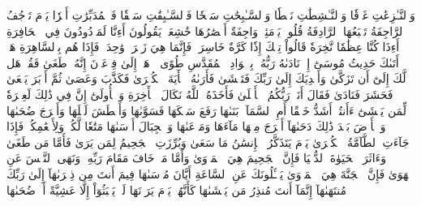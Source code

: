 وَٱلنَّـٰزِعَٰتِ غَرۡقٗا
وَٱلنَّـٰشِطَٰتِ نَشۡطٗا
وَٱلسَّـٰبِحَٰتِ سَبۡحٗا
فَٱلسَّـٰبِقَٰتِ سَبۡقٗا
فَٱلۡمُدَبِّرَٰتِ أَمۡرٗا
يَوۡمَ تَرۡجُفُ ٱلرَّاجِفَةُ
تَتۡبَعُهَا ٱلرَّادِفَةُ
قُلُوبٞ يَوۡمَئِذٖ وَاجِفَةٌ
أَبۡصَٰرُهَا خَٰشِعَةٞ
يَقُولُونَ أَءِنَّا لَمَرۡدُودُونَ فِي ٱلۡحَافِرَةِ
أَءِذَا كُنَّا عِظَٰمٗا نَّخِرَةٗ
قَالُواْ تِلۡكَ إِذٗا كَرَّةٌ خَاسِرَةٞ
فَإِنَّمَا هِيَ زَجۡرَةٞ وَٰحِدَةٞ
فَإِذَا هُم بِٱلسَّاهِرَةِ
هَلۡ أَتَىٰكَ حَدِيثُ مُوسَىٰٓ
إِذۡ نَادَىٰهُ رَبُّهُۥ بِٱلۡوَادِ ٱلۡمُقَدَّسِ طُوًى
ٱذۡهَبۡ إِلَىٰ فِرۡعَوۡنَ إِنَّهُۥ طَغَىٰ
فَقُلۡ هَل لَّكَ إِلَىٰٓ أَن تَزَكَّىٰ
وَأَهۡدِيَكَ إِلَىٰ رَبِّكَ فَتَخۡشَىٰ
فَأَرَىٰهُ ٱلۡأٓيَةَ ٱلۡكُبۡرَىٰ
فَكَذَّبَ وَعَصَىٰ
ثُمَّ أَدۡبَرَ يَسۡعَىٰ
فَحَشَرَ فَنَادَىٰ
فَقَالَ أَنَا۠ رَبُّكُمُ ٱلۡأَعۡلَىٰ
فَأَخَذَهُ ٱللَّهُ نَكَالَ ٱلۡأٓخِرَةِ وَٱلۡأُولَىٰٓ
إِنَّ فِي ذَٰلِكَ لَعِبۡرَةٗ لِّمَن يَخۡشَىٰٓ
ءَأَنتُمۡ أَشَدُّ خَلۡقًا أَمِ ٱلسَّمَآءُۚ بَنَىٰهَا
رَفَعَ سَمۡكَهَا فَسَوَّىٰهَا
وَأَغۡطَشَ لَيۡلَهَا وَأَخۡرَجَ ضُحَىٰهَا
وَٱلۡأَرۡضَ بَعۡدَ ذَٰلِكَ دَحَىٰهَآ
أَخۡرَجَ مِنۡهَا مَآءَهَا وَمَرۡعَىٰهَا
وَٱلۡجِبَالَ أَرۡسَىٰهَا
مَتَٰعٗا لَّكُمۡ وَلِأَنۡعَٰمِكُمۡ
فَإِذَا جَآءَتِ ٱلطَّآمَّةُ ٱلۡكُبۡرَىٰ
يَوۡمَ يَتَذَكَّرُ ٱلۡإِنسَٰنُ مَا سَعَىٰ
وَبُرِّزَتِ ٱلۡجَحِيمُ لِمَن يَرَىٰ
فَأَمَّا مَن طَغَىٰ
وَءَاثَرَ ٱلۡحَيَوٰةَ ٱلدُّنۡيَا
فَإِنَّ ٱلۡجَحِيمَ هِيَ ٱلۡمَأۡوَىٰ
وَأَمَّا مَنۡ خَافَ مَقَامَ رَبِّهِۦ وَنَهَى ٱلنَّفۡسَ عَنِ ٱلۡهَوَىٰ
فَإِنَّ ٱلۡجَنَّةَ هِيَ ٱلۡمَأۡوَىٰ
يَسۡـَٔلُونَكَ عَنِ ٱلسَّاعَةِ أَيَّانَ مُرۡسَىٰهَا
فِيمَ أَنتَ مِن ذِكۡرَىٰهَآ
إِلَىٰ رَبِّكَ مُنتَهَىٰهَآ
إِنَّمَآ أَنتَ مُنذِرُ مَن يَخۡشَىٰهَا
كَأَنَّهُمۡ يَوۡمَ يَرَوۡنَهَا لَمۡ يَلۡبَثُوٓاْ إِلَّا عَشِيَّةً أَوۡ ضُحَىٰهَا